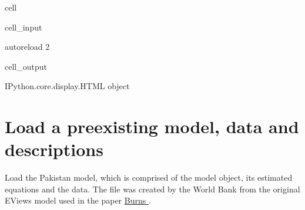 \documentclass[letterpaper,10pt,english]{jupyterBook}
\begin{document}
\begin{sphinxuseclass}{cell}\begin{sphinxVerbatimInput}

\begin{sphinxuseclass}{cell_input}
\begin{sphinxVerbatim}[commandchars=\\\{\}]
    
 autoreload
 2
\end{sphinxVerbatim}

\end{sphinxuseclass}\end{sphinxVerbatimInput}
\begin{sphinxVerbatimOutput}

\begin{sphinxuseclass}{cell_output}
\begin{sphinxVerbatim}[commandchars=\\\{\}]
\PYGZlt{}IPython.core.display.HTML object\PYGZgt{}
\end{sphinxVerbatim}

\end{sphinxuseclass}\end{sphinxVerbatimOutput}

\end{sphinxuseclass}

\section{Load a pre\sphinxhyphen{}existing model, data and descriptions}
\label{\detokenize{content/05_WBModels/MoreComplexScenarios:load-a-pre-existing-model-data-and-descriptions}}
\sphinxAtStartPar
Load the Pakistan model, which is comprised of the model object, its estimated equations and the data.  The  file was created by the World Bank from the original EViews model used in the paper \hyperlink{cite.content/99_BackMatter/References:id14}{Burns }.
\end{document}
